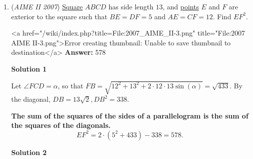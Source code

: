 \begin{enumerate}
Let $b = ak$ and $c = aj$ for $k,j \in \mathbb{Z}^+ \neq 0$, as $b,c \in \mathbb{Z}^+$. Then, factoring out $a$, we have $a(1+x+y) = 100$. $a$ is an integer, and so is $1+x+y$ by definition, so that implies $a \ | \ 100$. The possible choices for $a$ are $1, 2, 4, 5, 10, 20, 25, 50, 100$. Each of those gives options $k+j = 0,1,3,4,9,19,24,49,99$ respectively. Negate 0 and 1 as $k$ and $j$ are positive integers not equal to 0. While we can attempt to find through exclusion stars and bars the number of ways as $\binom{x-1}{y-1}$, coming to the realization that $y-1$ will always be 1 (as we have 2 variables $k,j$), and continuing by solution 1, we could also constructively overcount. By stars and bars, each two equations will have integer solutions, inclusive 0, as $\binom{x+y-1}{y-1}$. Note that $y=2$ forces the bottom of the binomial as 1, making it expendable and therefore we just consider $x+y-1$. Here, $y-1 = 1$ so we just consider $k+1$ cases total, so we sum over ALL terms and obtain $100+50+25+20+10+5+4 = 214$. However, 14 of these cases are invalid, particularly, when $k+j = 3,4,9,19,24,49,99$, and one of $k$ or $j$ is 0. There are two choice for which variable is 0, and 7 total $k+j$ values, which is $2 \cdot 7 = 14$ of the total that do not work, so the answer is $214 - 14 = \boxed{200}$.

 


	\item (\textit{AIME II 2007}) \href{https://artofproblemsolving.com/wiki/index.php?title=Square}{Square} $ABCD$ has side length $13$, and \href{https://artofproblemsolving.com/wiki/index.php?title=Point}{points} $E$ and $F$ are exterior to the square such that $BE=DF=5$ and $AE=CF=12$. Find $EF^{2}$.


 <a href="/wiki/index.php?title=File:2007\_AIME\_II-3.png" title="File:2007 AIME II-3.png">Error creating thumbnail: Unable to save thumbnail to destination</a>
 \textbf{Answer: }578



\textbf{Solution 1}

Let $\angle FCD = \alpha$, so that $FB = \sqrt{12^2 + 13^2 + 2\cdot12\cdot13\sin(\alpha)} = \sqrt{433}$. By the diagonal, $DB = 13\sqrt{2}, DB^2 = 338$. 

 \textbf{The sum of the squares of the sides of a parallelogram is the sum of the squares of the diagonals.}
 \[EF^2 = 2\cdot(5^2 + 433) - 338 = 578.\]




\textbf{Solution 2}


\end{enumerate}
